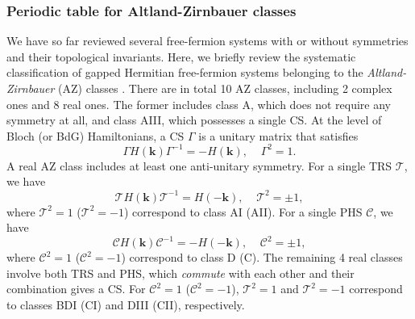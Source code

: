 \documentclass{tADP2e}
\theoremstyle{plain}
\theoremstyle{plain}
\theoremstyle{definition}
\begin{document}
\subsubsection{Periodic table for Altland-Zirnbauer classes}
\label{ptAZ}
We have so far reviewed several  free-fermion systems with or without symmetries and their topological invariants.  
Here, we briefly review the systematic classification of gapped Hermitian free-fermion systems belonging to the \emph{Altland-Zirnbauer} (AZ) classes \cite{AA97,SAP08,AK09}. There are in total 10 AZ classes, including 2 complex ones and 8 real ones. The former includes class A, which does not require any symmetry at all, and class AIII, which possesses a single CS. At the level of Bloch (or BdG) Hamiltonians, a CS $\Gamma$ is a unitary matrix that satisfies
\begin{equation}
\Gamma H(\boldsymbol{k}) \Gamma^{-1}=-H(\boldsymbol{k}),\;\;\;\;\Gamma^2=1. 
\label{CS}
\end{equation}
A real AZ class includes at least one anti-unitary symmetry. For a single TRS $\mathcal{T}$, we have
\begin{equation}
\mathcal{T}H(\boldsymbol{k}) \mathcal{T}^{-1}=H(-\boldsymbol{k}),\;\;\;\;\mathcal{T}^2=\pm1, 
\label{TRS}
\end{equation}
where $\mathcal{T}^2=1$ ($\mathcal{T}^2=-1$) correspond to class AI (AII). For a single PHS $\mathcal{C}$, we have
\begin{equation}
\mathcal{C}H(\boldsymbol{k}) \mathcal{C}^{-1}=-H(-\boldsymbol{k}),\;\;\;\;\mathcal{C}^2=\pm1, 
\label{PHS}
\end{equation}
where $\mathcal{C}^2=1$ ($\mathcal{C}^2=-1$) correspond to class D (C). The remaining 4 real classes involve both TRS and PHS, which \emph{commute} with each other and their combination gives a CS. For $\mathcal{C}^2=1$ ($\mathcal{C}^2=-1$), $\mathcal{T}^2=1$ and $\mathcal{T}^2=-1$ correspond to classes BDI (CI) and DIII (CII), respectively. 
\end{document}
